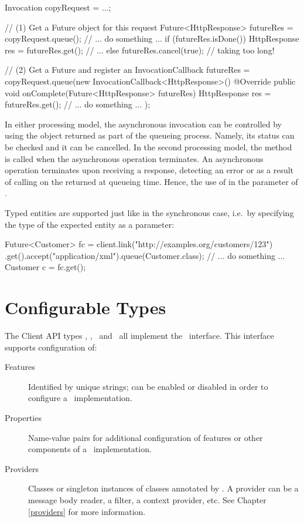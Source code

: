 \begin{listing}{1}
Invocation copyRequest = ...;

// (1) Get a Future object for this request
Future<HttpResponse> futureRes = copyRequest.queue();
// ... do something ...
if (futureRes.isDone()) {
    HttpResponse res = futureRes.get();
    // ...
} else {
    futureRes.cancel(true);        // taking too long!
}

// (2) Get a Future and register an InvocationCallback
futureRes = copyRequest.queue(new InvocationCallback<HttpResponse>() {
    @Override
    public void onComplete(Future<HttpResponse> futureRes) { 
        HttpResponse res = futureRes.get();
        // ... do something ... 
    }
});
\end{listing}

In either processing model, the asynchronous invocation can be controlled by using the  object returned as part of the queueing process. Namely, its status can be checked and it can be cancelled. In the second processing model, the method  is called when the asynchronous operation terminates. An asynchronous operation terminates upon receiving a response, detecting an error or as a result of calling  on the  returned at queueing time. Hence, the use of  in the parameter of .

Typed entities are supported just like in the synchronous case, i.e.~by specifying the type of the expected entity as a parameter:

\begin{listing}{1}
Future<Customer> fc = client.link("http://examples.org/customers/123")
    .get().accept("application/xml").queue(Customer.class);
// ... do something ...
Customer c = fc.get();
\end{listing}

\section{Configurable Types}
\label{configurable_types}

The Client API types \Client, \ClientConfiguration, \Link\ and \Invocation\ all implement the \Configurable\ interface. This interface supports configuration of:

\begin{description}
\item [Features] Identified by unique strings; can be enabled or disabled in order to configure a \jaxrs\ implementation.
\item [Properties] Name-value pairs for additional configuration of features or other components of a \jaxrs\ implementation.
\item [Providers] Classes or singleton instances of classes annotated by \Provider. A provider can be a message body reader, a filter, a context provider, etc. See Chapter \ref{providers} for more information.
\end{description}

